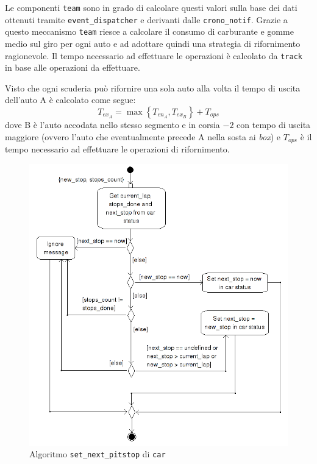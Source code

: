 \documentclass[a4paper]{report}
\begin{document}
Le componenti \texttt{team} sono in grado di calcolare questi valori sulla base dei dati ottenuti tramite \texttt{event\_dispatcher} e derivanti dalle \texttt{crono\_notif}. Grazie a questo meccanismo \texttt{team} riesce a calcolare il consumo di carburante e gomme medio sul giro per ogni auto e ad adottare quindi una strategia di rifornimento ragionevole.
Il tempo necessario ad effettuare le operazioni è calcolato da \texttt{track} in base alle operazioni da effettuare.

Visto che ogni scuderia può rifornire una sola auto alla volta il tempo di uscita dell'auto A è calcolato come segue:
\[ T_{ex_A} = \max \left\{ T_{en_A}, T_{ex_B} \right\} + T_{ops} \]
dove B è l'auto accodata nello stesso segmento e in corsia $-2$ con tempo di uscita maggiore (ovvero l'auto che eventualmente precede A nella sosta ai \textit{box}) e $T_{ops}$ è il tempo necessario ad effettuare le operazioni di rifornimento.

\begin{figure}
\includegraphics[width=\textwidth]{diagrammi/NextPitstop}
\caption{Algoritmo \texttt{set\_next\_pitstop} di \texttt{car}}
\label{fig:nextPitstop}
\end{figure}
\end{document}
